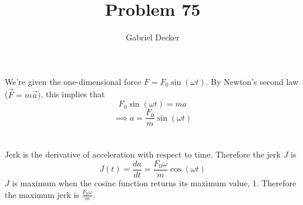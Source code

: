 \documentclass[12pt]{article}
\title{Problem 75}
\author{Gabriel Decker}
\newcommand{\ds}{\displaystyle}
\begin{document}
\maketitle
\begin{flushleft}



We're given the one-dimensional force $F=F_0\sin(\omega t)$.
By Newton's second law ($\vec{F}=m\vec{a})$, this implies that
$$F_0\sin(\omega t)=ma$$
$$\implies a=\frac{F_0}{m}\sin(\omega t)$$\\~\\

Jerk is the derivative of acceleration with respect to time.
Therefore the jerk $J$ is
$$J(t)=\frac{da}{dt}=\frac{F_0\omega}{m}\cos(\omega t)$$
$J$ is maximum when the cosine function returns its maximum value, 1.
Therefore the maximum jerk is $\ds\frac{F_0\omega}{m}$.




\end{flushleft}
\end{document}
